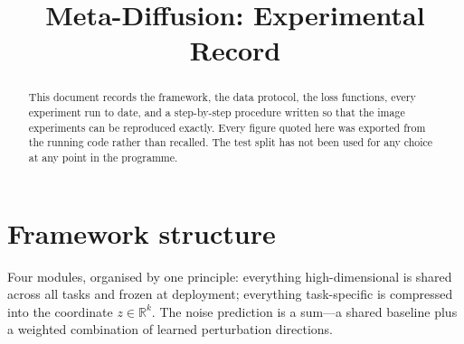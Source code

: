 \documentclass[11pt]{article}
\title{Meta-Diffusion: Experimental Record}
\author{}
\date{}
\begin{document}
\maketitle

\begin{abstract}
\noindent
This document records the framework, the data protocol, the loss functions, every experiment run
to date, and a step-by-step procedure written so that the image experiments can be reproduced
exactly. Every figure quoted here was exported from the running code rather than recalled. The
test split has not been used for any choice at any point in the programme.
\end{abstract}

\tableofcontents
\bigskip

\section{Framework structure}
\label{sec:framework}

Four modules, organised by one principle: everything high-dimensional is shared across all tasks
and frozen at deployment; everything task-specific is compressed into the coordinate
$z \in \mathbb{R}^{k}$. The noise prediction is a sum---a shared baseline plus a weighted
combination of learned perturbation directions.
\end{document}
